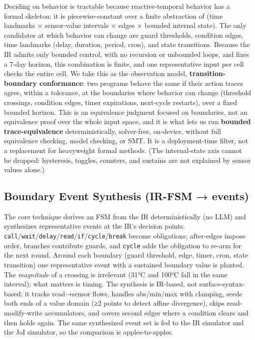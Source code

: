 \documentclass[sigconf,nonacm,anonymous,review]{acmart}
\begin{document}
Deciding on behavior is tractable because reactive-temporal behavior has a formal skeleton: it is piecewise-constant over a finite abstraction of (time landmarks × sensor-value intervals × edges × bounded internal state). The only candidates at which behavior can change are guard thresholds, condition edges, time landmarks (delay, duration, period, cron), and state transitions. Because the IR admits only bounded control, with no recursion or unbounded loops, and fixes a 7-day horizon, this combination is finite, and one representative input per cell checks the entire cell. We take this as the observation model, \textbf{transition-boundary conformance}: two programs behave the same if their action traces agree, within a tolerance, at the boundaries where behavior can change (threshold crossings, condition edges, timer expirations, next-cycle restarts), over a fixed bounded horizon. This is an equivalence judgment focused on boundaries, not an equivalence proof over the whole input space, and it is what lets us run \textbf{bounded trace-equivalence} deterministically, solver-free, on-device, without full equivalence checking, model checking, or SMT. It is a deployment-time filter, not a replacement for heavyweight formal methods. (The internal-state axis cannot be dropped: hysteresis, toggles, counters, and sustains are not explained by sensor values alone.)

\subsection{Boundary Event Synthesis (IR-FSM → events)}

The core technique derives an FSM from the IR deterministically (no LLM) and synthesizes representative events at the IR's decision points. \texttt{call}/\texttt{wait}/\texttt{delay}/\texttt{read}/\texttt{if}/\texttt{cycle}/\texttt{break} become obligations; after-edges impose order, branches contribute guards, and \texttt{cycle} adds the obligation to re-arm for the next round. Around each boundary (guard threshold, edge, timer, cron, state transition) one representative event with a sustained boundary value is planted. The \emph{magnitude} of a crossing is irrelevant (31°C and 100°C fall in the same interval); what matters is timing. The synthesis is IR-based, not surface-syntax-based: it tracks read→sensor flows, handles abs/min/max with clamping, seeds both ends of a value domain (≥2 points to detect affine divergence), skips read-modify-write accumulators, and covers second edges where a condition clears and then holds again. The same synthesized event set is fed to the IR simulator and the JoI simulator, so the comparison is apples-to-apples.
\end{document}
